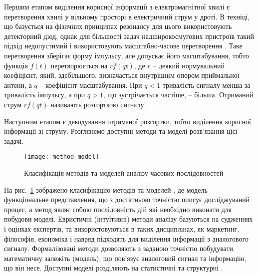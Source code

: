 Першим етапом виділення корисної інформації з електромагнітної хвилі є 
перетворення хвилі у вільному просторі в електричний струм у дроті. В техніці, 
що базується на фізичних принципах резонансу для цього використовують 
детекторний діод, однак для більшості задач надширокосмугових пристроїв 
такий підхід недопустимий і використовують масштабно-часове перетворення
\cite{imp:Lazorenko2009}. Таке перетворення зберігає форму імпульсу, але 
допускає його масштабування, тобто функція $ f(t) $ перетворюється на 
$ r f(qt) $, де $ r $ -- деякий нормувальний коефіцієнт, який, здебільшого, 
визначається внутрішнім опором приймальної антени, а $ q $ -- коефіцієнт 
масштабування. При $ q < 1 $ тривалість сигналу менша за тривалість імпульсу, 
а при $ q > 1 $, що зустрічається частіше, -- більша. Отриманий струм 
$ r f(qt) $ називають розгорткою сигналу.

Наступним етапом є декодування отриманої розгортки, тобто виділення корисної 
інформації зі струму. Розглянемо доступні методи та моделі розв'язання цієї 
задачі.

\begin{figure}[htbp] \begin{center}
\texttt{[image: method\_model]}
\caption{Класифікація методів та моделей аналізу часових послідовностей} 
\label{fig:method_model}
\end{center} \end{figure}

На рис.~\ref{fig:method_model} зображено класифікацію методів та моделей 
\cite{imp:Chuchueva2012}, де модель -- функціональне представлення, що з 
достатньою точністю описує досліджуваний процес, а метод являє собою 
послідовність дій які необхідно виконати для побудови моделі. Евристичні 
(інтуїтивні) методи аналізу базуються на судженнях і оцінках експертів, 
та використовуються в таких дисциплінах, як маркетинг, філософія, економіка 
і навряд підходять для виділення інформації з аналогового 
сигналу. Формалізовані методи дозволяють з заданою точністю побудувати 
математичну залежіть (модель), що пов'язує аналоговий сигнал та інформацію, 
що він несе. Доступні моделі розділяють на статистичні та структурні 
\cite{imp:Chuchueva2012}.

